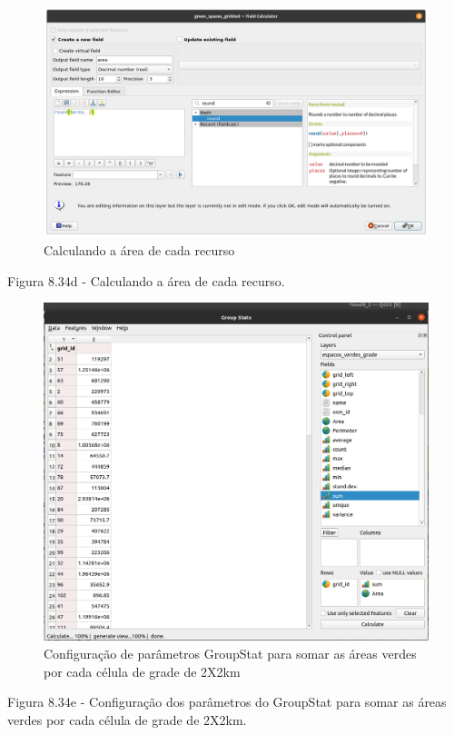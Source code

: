 \documentclass[
]{book}
\begin{document}
\begin{figure}
\centering
\includegraphics{media/modulo8/fig834_d.png}
\caption{Calculando a área de cada recurso}
\end{figure}

Figura 8.34d - Calculando a área de cada recurso.

\begin{figure}
\centering
\includegraphics{media/modulo8/fig834_e.png}
\caption{Configuração de parâmetros GroupStat para somar as áreas verdes por cada célula de grade de 2X2km}
\end{figure}

Figura 8.34e - Configuração dos parâmetros do GroupStat para somar as áreas verdes por cada célula de grade de 2X2km.
\end{document}
